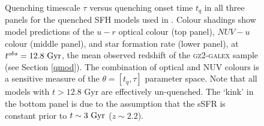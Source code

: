 \begin{figure}
\caption[Predicted colours and SFRs of quenching models]{Quenching timescale $\tau$ versus quenching onset time $t_q$ in all three panels for the quenched SFH models used in \starpy. Colour shadings show model predictions of the $u-r$ optical colour (top panel), $NUV-u$ colour (middle panel), and star formation rate (lower panel), at $t^{obs} = 12.8~\rm{Gyr}$, the mean observed redshift of the \textsc{gz2-galex} sample (see Section \ref{qmod}). The combination of optical and NUV colours is a sensitive measure of the $\theta = [t_q, \tau]$ parameter space. Note that all models with $t > 12.8$ \rm{Gyr} are effectively un-quenched. The `kink' in the bottom panel is due to the assumption that the sSFR is constant prior to $t \sim 3~\rm{Gyr}$ ($z\sim 2.2$).}
\label{pred}
\end{figure}

